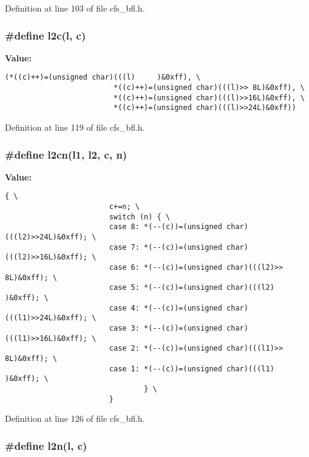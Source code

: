 Definition at line 103 of file cfs\_\-bfl.h.
\subsubsection{\setlength{\rightskip}{0pt plus 5cm}\#define l2c({\bf l}, {\bf c})}\label{cfs__bfl_8h_a2}


{\bf Value:}

\footnotesize\begin{verbatim}(*((c)++)=(unsigned char)(((l)     )&0xff), \
                         *((c)++)=(unsigned char)(((l)>> 8L)&0xff), \
                         *((c)++)=(unsigned char)(((l)>>16L)&0xff), \
                         *((c)++)=(unsigned char)(((l)>>24L)&0xff))
\end{verbatim}\normalsize 


Definition at line 119 of file cfs\_\-bfl.h.
\subsubsection{\setlength{\rightskip}{0pt plus 5cm}\#define l2cn(l1, l2, {\bf c}, {\bf n})}\label{cfs__bfl_8h_a3}


{\bf Value:}

\footnotesize\begin{verbatim}{ \
                        c+=n; \
                        switch (n) { \
                        case 8: *(--(c))=(unsigned char)(((l2)>>24L)&0xff); \
                        case 7: *(--(c))=(unsigned char)(((l2)>>16L)&0xff); \
                        case 6: *(--(c))=(unsigned char)(((l2)>> 8L)&0xff); \
                        case 5: *(--(c))=(unsigned char)(((l2)     )&0xff); \
                        case 4: *(--(c))=(unsigned char)(((l1)>>24L)&0xff); \
                        case 3: *(--(c))=(unsigned char)(((l1)>>16L)&0xff); \
                        case 2: *(--(c))=(unsigned char)(((l1)>> 8L)&0xff); \
                        case 1: *(--(c))=(unsigned char)(((l1)     )&0xff); \
                                } \
                        }
\end{verbatim}\normalsize 


Definition at line 126 of file cfs\_\-bfl.h.
\subsubsection{\setlength{\rightskip}{0pt plus 5cm}\#define l2n({\bf l}, {\bf c})}\label{cfs__bfl_8h_a7}


